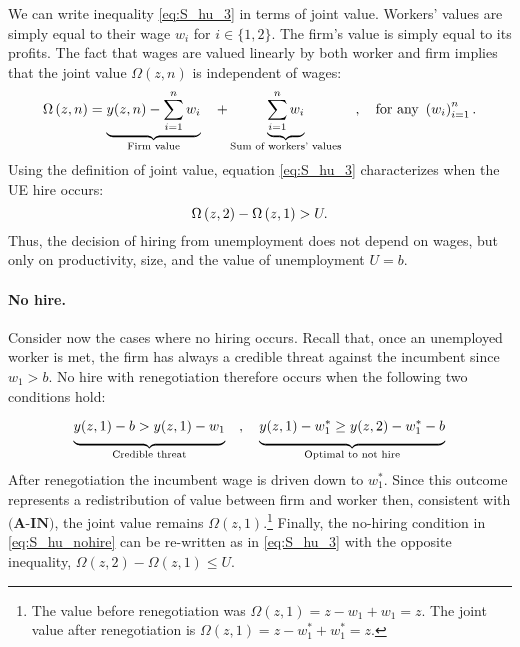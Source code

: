 We can write inequality \eqref{eq:S_hu_3} in terms of joint value.
Workers' values are simply equal to their wage $w_i$ for $i\in\{1,2\}$. The firm's value is simply equal to its profits. The fact that wages are valued linearly by both worker and firm implies that the joint value $\Omega(z,n)$ is independent of wages:
\vspace*{-.3cm}\begin{equation*}
\Omega \left(z,n\right) = \underbrace{ y(z,n) - \sum_{i=1}^{n} w_i  }_\text{Firm value} \quad  + \underbrace{ \sum_{i=1}^{n} w_i }_\text{Sum of workers' values}
\quad,\quad\text{for any }\left(w_i\right)_{i=1}^n.
\vspace*{-.3cm}\end{equation*}
Using the definition of joint value, equation \eqref{eq:S_hu_3} characterizes when the UE hire occurs:
\vspace*{-.3cm}\begin{equation}\label{eq:S_hu_omega}
\Omega \left( z,2\right) -\Omega \left( z,1\right) > U.
\vspace*{-.3cm}\end{equation}%
Thus, the decision of hiring from unemployment does not depend on wages, but only on productivity, size, and the value of unemployment $U=b$.

\vspace*{-.3cm}
\paragraph{No hire.}
Consider now the cases where no hiring occurs. Recall that, once an unemployed worker is met, the firm has always a credible threat against the incumbent since $w_1>b$. No hire with renegotiation therefore occurs when the following two conditions hold:
\vspace*{-.3cm}\begin{equation}\label{eq:S_hu_nohire}
\underbrace{\Big.
y(z,1) - b > y(z,1) - w_1
\Big.}_{\text{Credible threat}} \quad,\quad
\underbrace{\Big.
y(z,1) - w_1^* \geq y(z,2) - w_1^* - b
\Big.}_{\text{Optimal to not hire}}
\vspace*{-.3cm}\end{equation}
After renegotiation the incumbent wage is driven down to $w_1^{\ast}$. Since this outcome represents a redistribution of value between firm and worker then, consistent with $\textbf{(A-IN)}$, the joint value remains $\Omega(z,1)$.\footnote{
    The value before renegotiation was $\Omega \left( z,1\right) =z-w_{1}+w_{1}=z$.
    The joint value after renegotiation is $\Omega \left( z,1\right) =z-w_1^*+w_1^*=z$.}
Finally, the no-hiring condition in \eqref{eq:S_hu_nohire} can be re-written as in \eqref{eq:S_hu_3} with the opposite inequality, $\Omega(z,2) - \Omega(z,1) \leq U$.

